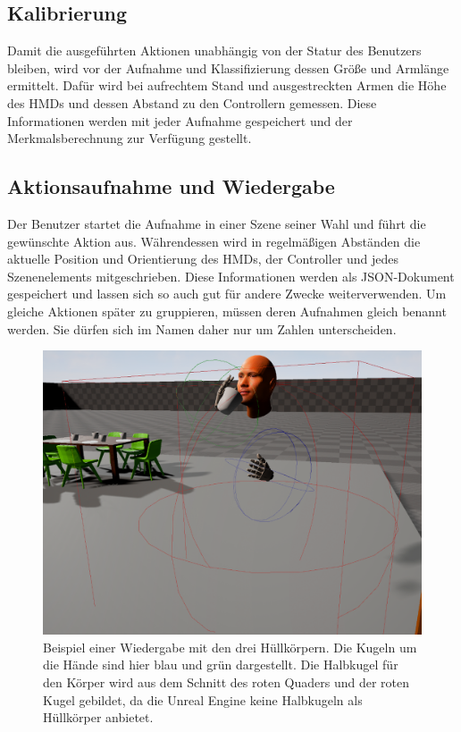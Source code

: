 \subsection{Kalibrierung}
Damit die ausgeführten Aktionen unabhängig von der Statur des Benutzers bleiben, wird vor der Aufnahme und Klassifizierung dessen Größe und Armlänge ermittelt. Dafür wird bei aufrechtem Stand und ausgestreckten Armen die Höhe des HMDs und dessen Abstand zu den Controllern gemessen. Diese Informationen werden mit jeder Aufnahme gespeichert und der Merkmalsberechnung zur Verfügung gestellt.

\subsection{Aktionsaufnahme und Wiedergabe}
\label{subsec:aktionsaufnahme-und-wiedergabe}
Der Benutzer startet die Aufnahme in einer Szene seiner Wahl und führt die gewünschte Aktion aus. Währendessen wird in regelmäßigen Abständen die aktuelle Position und Orientierung des HMDs, der Controller und jedes Szenenelements mitgeschrieben. Diese Informationen werden als JSON-Dokument gespeichert und lassen sich so auch gut für andere Zwecke weiterverwenden. Um gleiche Aktionen später zu gruppieren, müssen deren Aufnahmen gleich benannt werden. Sie dürfen sich im Namen daher nur um Zahlen unterscheiden.\newline
\begin{figure}[hbtp]
\includegraphics[width=1.0\linewidth]{PlaybackActor.png}
\caption{Beispiel einer Wiedergabe mit den drei Hüllkörpern. Die Kugeln um die Hände sind hier blau und grün dargestellt. Die Halbkugel für den Körper wird aus dem Schnitt des roten Quaders und der roten Kugel gebildet, da die Unreal Engine keine Halbkugeln als Hüllkörper anbietet.}
\label{fig:playback-actor}
\end{figure}
